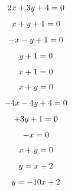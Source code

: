 \documentclass[10pt,a4paper]{article}
\begin{document}
	\[\rettaimplicita{2}{3}{4}\]
	
	\[\rettaimplicita{1}{1}{1}\]
	
	\[\rettaimplicita{-1}{-1}{1}\]
	
	\[\rettaimplicita{0}{1}{1}\]
	
	\[\rettaimplicita{1}{0}{1}\]
	
	\[\rettaimplicita{1}{1}{0}\]
	
	\[\rettaimplicita{-4}{-4}{4}\]
	
	\[\rettaimplicita{0}{3}{1}\]
	
	\[\rettaimplicita{-1}{0}{0}\]
	
	\[\rettaimplicita{1}{1}{0}\]
	
	\[\rettaesplicita{1}{2}\]

	\[\rettaesplicita{-10}{2}\]
\end{document}
